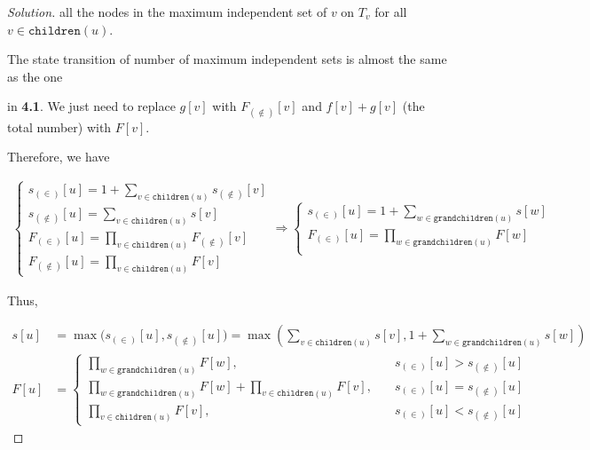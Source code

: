 \documentclass{article}
\newenvironment{solution}{\begin{proof}[\noindent\it Solution]}{\end{proof}}
\begin{document}
\begin{solution}
    all the nodes in the maximum independent set of $v$ on $T_v$ for all $v\in\mathtt{children}(u)$. 
    
    \hspace{2.6em}
    The state transition of number of maximum independent sets is almost the same as the one 
    
    in \textbf{4.1}. We just need to replace $g[v]$ with $F_{(\notin)}[v]$ and $f[v]+g[v]$ (the total number) with $F[v]$.
    
    \vspace{2em} \hspace{2.6em}
    Therefore, we have
    
    \vspace{-2em}
    \begin{align*}
    \left\{
    \begin{array}{l}
        s_{(\in)}[u] = 1+\underset{v\in\mathtt{children}(u)}{\sum}s_{(\notin)}[v] \\
        s_{(\notin)}[u] = \underset{v\in\mathtt{children}(u)}{\sum}s[v] \\
        F_{(\in)}[u] = \underset{v\in\mathtt{children}(u)}{\prod} F_{(\notin)}[v] \\
        F_{(\notin)}[u] = \underset{v\in\mathtt{children}(u)}{\prod} F[v]
        \end{array}
    \right. \Longrightarrow
    \left\{\begin{array}{l}
        s_{(\in)}[u] = 1+\underset{w\in\mathtt{grandchildren}(u)}{\sum}s[w]  \\
        F_{(\in)}[u] = \underset{w\in\mathtt{grandchildren}(u)}{\prod}F[w] \\
    \end{array}\right.
    \end{align*}
    
    \hspace{2.6em}
    Thus,
    
    \vspace{-2em}
    \begin{align*}
        s[u]& =\max\Big(s_{(\in)}[u],s_{(\notin)}[u]\Big)=\max\left(\sum_{v\in\mathtt{children}(u)}s[v],1+\sum_{w\in\mathtt{grandchildren}(u)}s[w]\right) \\
        F[u] &= \left\{\begin{array}{ll}
            \underset{w\in\mathtt{grandchildren}(u)}{\prod}F[w], & \quad s_{(\in)}[u]>s_{(\notin)}[u] \\
            \underset{w\in\mathtt{grandchildren}(u)}{\prod}F[w]+\underset{v\in\mathtt{children}(u)}{\prod}F[v], &\quad  s_{(\in)}[u]=s_{(\notin)}[u] \\
            \underset{v\in\mathtt{children}(u)}{\prod}F[v], & \quad s_{(\in)}[u]<s_{(\notin)}[u]
        \end{array}\right.
    \end{align*}
    

\end{solution}
\end{document}
